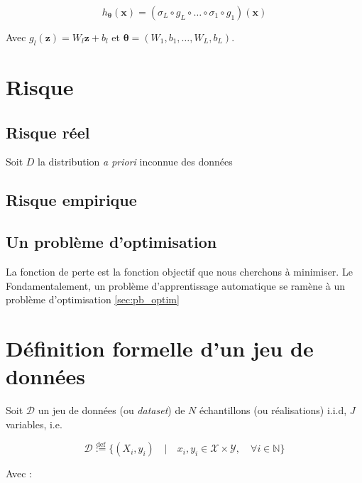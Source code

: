 \begin{equation}
    h_{\boldsymbol{\theta}}(\boldsymbol{x}) = (\sigma_L \circ g_L \circ \ldots \circ \sigma_1 \circ g_1) (\boldsymbol{x}) \nonumber
\end{equation}

\vspace{1em}

\noindent Avec $g_l(\boldsymbol{z}) = W_l \boldsymbol{z} + b_l$ et $\boldsymbol{\theta} = \left( W_1, b_1, \dots, W_L, b_L \right)$.

\section{Risque}
\label{sec:risk}
\subsection{Risque réel}

\noindent Soit $D$ la distribution \textit{a priori} inconnue des données 

\subsection{Risque empirique}

\subsection{Un problème d'optimisation}

La fonction de perte est la fonction objectif que nous cherchons à minimiser. Le  Fondamentalement, un problème d'apprentissage automatique se ramène à un problème d'optimisation \ref{sec:pb_optim}


\section{Définition formelle d'un jeu de données}

\noindent Soit $\mathcal{D}$ un jeu de données (ou \textit{dataset}) de $N$ échantillons (ou réalisations) i.i.d, $J$ variables, i.e. 

\begin{equation}
    \mathcal{D} \stackrel{\text{def}}:=
    \{ (X_i, y_i) \quad | \quad x_i, y_i \in \mathcal{X} \times \mathcal{Y}, \quad \forall i \in {\mathbb{N}} \}
\end{equation}

Avec : \newline

